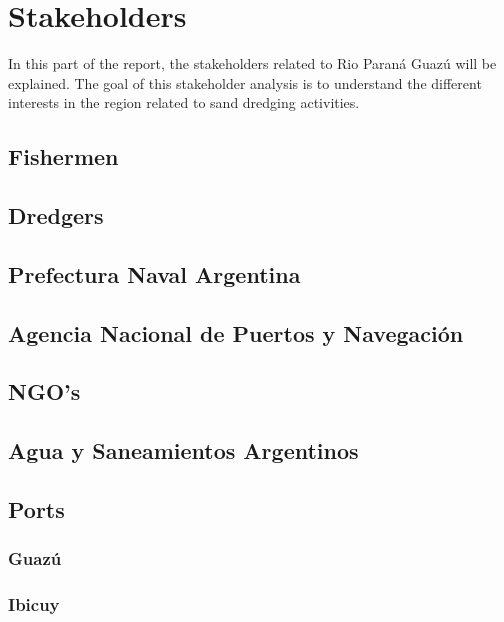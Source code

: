 \chapter{Stakeholders}
\label{chapter:stakeholders}

In this part of the report, the stakeholders related to Rio Paraná Guazú will be explained. The goal of this stakeholder analysis is to understand the different interests in the region related to sand dredging activities.

\section{Fishermen}


\section{Dredgers}


\section{Prefectura Naval Argentina}


\section{Agencia Nacional de Puertos y Navegación}


\section{NGO's}


\section{Agua y Saneamientos Argentinos}


\section{Ports}



\subsection{Guazú}

\subsection{Ibicuy}